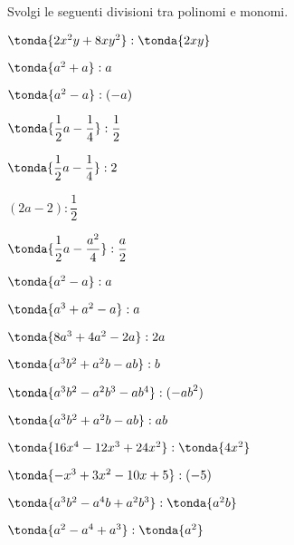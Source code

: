 \begin{esercizio}
\label{ese:10.17}
Svolgi le seguenti divisioni tra polinomi e monomi.
\begin{htmulticols}{2}
\begin{enumeratea}
\spazielenx
\item \(\tonda{2x^{2}y+8{xy}^{2}}:\tonda{2{xy}}\)
\item \(\tonda{a^{2}+a}:a\)
\item \(\tonda{a^{2}-a}:(-a)\)
\item \(\tonda{\dfrac{1}{2}a-\dfrac{1}{4}}:\dfrac{1}{2}\)
\item \(\tonda{\dfrac{1}{2}a-\dfrac{1}{4}}:2\)
\item \((2a-2):\dfrac{1}{2}\)
\item \(\tonda{\dfrac{1}{2}a-\dfrac{a^{2}}{4}}:\dfrac{a}{2}\)
% 
\item \(\tonda{a^{2}-a}:a\)
\item \(\tonda{a^{3}+a^{2}-a}:a\)
\item \(\tonda{8a^{3}+4a^{2}-2a}:2a\)
\item \(\tonda{a^{3}b^{2}+a^{2}b-ab}:b\)
\item \(\tonda{a^{3}b^{2}-a^{2}b^{3}-ab^{4}}:(-{ab}^{2})\)
\item \(\tonda{a^{3}b^{2}+a^{2}b-ab}:ab\)
\item \(\tonda{16x^{4}-12x^{3}+24x^{2}}:\tonda{4x^{2}}\)
\item \(\tonda{-x^{3}+3x^{2}-10x+5}:(-5)\)
% 
% 
% 
\item \(\tonda{a^{3}b^{2}-a^{4}b+a^{2}b^{3}}:\tonda{a^{2}b}\)
\item \(\tonda{a^{2}-a^{4}+a^{3}}:\tonda{a^{2}}\)

\end{enumeratea}
\end{htmulticols}
\end{esercizio}
